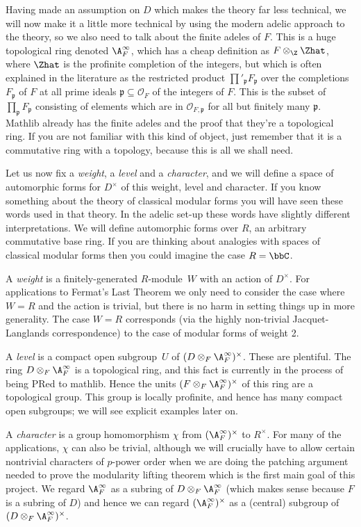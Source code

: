 Having made an assumption on $D$ which makes the theory far less technical, we will now
make it a little more technical by using the modern adelic approach to the theory,
so we also need to talk about the finite adeles of $F$. This is a huge topological ring
denoted $\A_F^\infty$, which has a cheap definition as $F\otimes_{\Z}\Zhat$, where $\Zhat$ is
the profinite completion of the integers, but which is often explained in the literature
as the restricted product $\prod'_{\mathfrak{p}}F_{\mathfrak{p}}$ over the completions
$F_{\mathfrak{p}}$ of $F$ at all prime ideals $\mathfrak{p}\subseteq\mathcal{O}_F$ of the
integers of $F$. This is the subset of $\prod_{\mathfrak{p}}F_{\mathfrak{p}}$ consisting
of elements which are in $\mathcal{O}_{F,\mathfrak{p}}$ for all but finitely many $\mathfrak{p}$.
Mathlib already has the finite adeles and the proof that they're a topological ring. If you are
not familiar with this kind of object, just remember that it is a commutative ring with a topology,
because this is all we shall need.

Let us now fix a \emph{weight}, a \emph{level} and a \emph{character}, and we will define
a space of automorphic forms for $D^\times$ of this weight, level and character. If you know something
about the theory of classical modular forms you will have seen these words used in that theory.
In the adelic set-up these words have slightly different interpretations. We will define automorphic
forms over $R$, an arbitrary commutative base ring. If you are thinking about analogies with
spaces of classical modular forms then you could imagine the case $R=\bbC$.

A \emph{weight} is a finitely-generated $R$-module~$W$ with an action of $D^\times$. For applications
to Fermat's Last Theorem we only need to consider the case where $W=R$ and the action is trivial,
but there is no harm in setting things up in more generality. The case $W=R$ corresponds (via
the highly non-trivial Jacquet-Langlands correspondence) to the case of modular forms of weight 2.

A \emph{level} is a compact open subgroup~$U$ of $(D\otimes_F\A_F^\infty)^\times$. These are plentiful.
The ring $D\otimes_F\A_F^\infty$ is a topological ring, and this fact is currently in the process
of being PRed to mathlib. Hence the units $(F\otimes_F\A_F^\infty)^\times$ of this ring are a topological
group. This group is locally profinite, and hence has many compact open subgroups; we will see
explicit examples later on.

A \emph{character} is a group homomorphism $\chi$ from $(\A_F^\infty)^\times$ to $R^\times$. For many
of the applications, $\chi$ can also be trivial, although we will crucially have to allow
certain nontrivial characters of $p$-power order when we are doing the patching argument needed
to prove the modularity lifting theorem which is the first main goal of this project.
We regard $\A_F^\infty$ as a subring of $D\otimes_F\A_F^\infty$ (which makes sense because
$F$ is a subring of $D$) and hence we can regard $(\A_F^\infty)^\times$ as a (central)
subgroup of $(D\otimes_F\A_F^\infty)^\times$.

